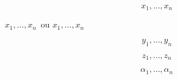 \documentclass[a4paper,12pt]{article}
\begin{document}
	
	\newcommand{\xvec}{ x_1, \ldots, x_n }

	\[ \xvec \]
	
	\renewcommand{\xvec}{\ensuremath{ x_1, \ldots, x_n }}
	
	\xvec\ ou \(\xvec\)
	
	
	
	\newcommand{\avec}[1]{\ensuremath{ #1_1, \ldots, #1_n }}
	
	
	\[  \avec{y}     \]
	
	\[  \avec{z}     \]
	
	\[  \avec \alpha  \]


	\renewcommand{\avec}[3]{\ensuremath{ {#1}_{#2}, \ldots, {#1}_{#3} }}
	
\end{document}
